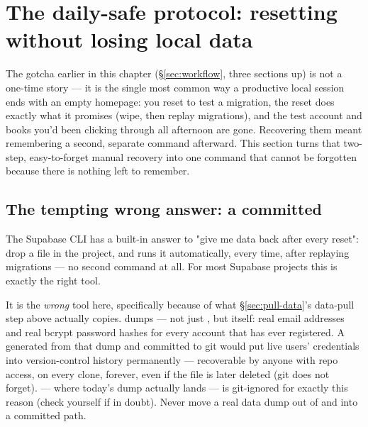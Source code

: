 \section{The daily-safe protocol: resetting without losing local data}
\label{sec:reset-full}

The  gotcha earlier in this chapter (\S\ref{sec:workflow}, three sections up) is not a one-time story — it is the single most common way a productive local session ends with an empty homepage: you reset to test a migration, the reset does exactly what it promises (wipe, then replay migrations), and the test account and books you'd been clicking through all afternoon are gone. Recovering them meant remembering a second, separate command afterward. This section turns that two-step, easy-to-forget manual recovery into one command that cannot be forgotten because there is nothing left to remember.

\subsection{The tempting wrong answer: a committed }

The Supabase CLI has a built-in answer to "give me data back after every reset": drop a  file in the project, and  runs it automatically, every time, after replaying migrations — no second command at all. For most Supabase projects this is exactly the right tool.

\begin{olkwarn}
It is the \emph{wrong} tool here, specifically because of what \S\ref{sec:pull-data}'s data-pull step above actually copies.  dumps  — not just , but  itself: real email addresses and real bcrypt password hashes for every account that has ever registered. A  generated from that dump and committed to git would put live users' credentials into version-control history permanently — recoverable by anyone with repo access, on every clone, forever, even if the file is later deleted (git does not forget).  — where today's dump actually lands — is git-ignored for exactly this reason (check  yourself if in doubt). Never move a real data dump out of  and into a committed path.
\end{olkwarn}

